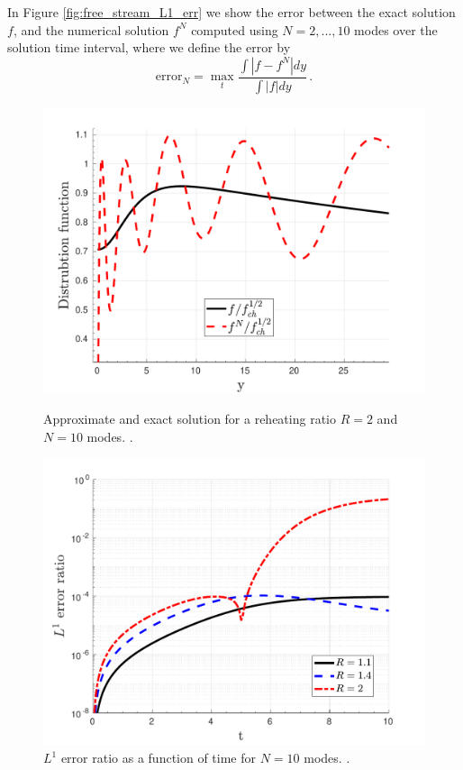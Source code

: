 In Figure  \ref{fig:free_stream_L1_err} we show the error between the exact solution $f$, and the numerical solution $f^N$ computed using $N=2,...,10$ modes over the solution time interval, where we define the error by
\begin{equation}\label{f_err}
\text{error}_N=\max_{t} \frac{\int |f-f^N|dy}{\int |f|dy}\,.
\end{equation}
\begin{figure}[ht]
\centerline{\includegraphics[width=0.8\linewidth]{06-appendix/SpectralMethodBoltzmann/Figures/free_stream_approx_T_r_2.pdf}}
\caption{Approximate and exact solution for a reheating ratio $R=2$ and $N=10$ modes. .}\label{fig:free_stream_approx_T_r_2}
 \centerline{\includegraphics[width=0.8\linewidth]{06-appendix/SpectralMethodBoltzmann/Figures/free_stream_L1_err_time.pdf}}
\caption{$L^1$ error ratio as a function of time for $N=10$ modes. .}\label{fig:free_stream_L1_err_time}
\end{figure}
